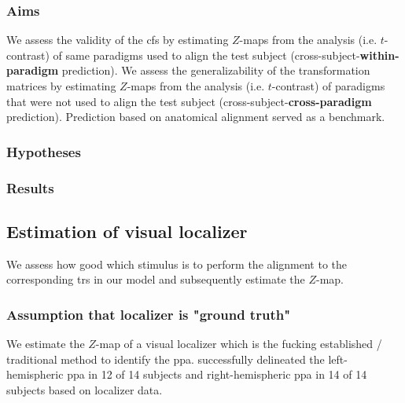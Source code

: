 \subsubsection{Aims}



%
We assess the validity of the \ac{cfs} by estimating $Z$-maps from the analysis
(i.e. $t$-contrast) of same paradigms used to align the test subject
(cross-subject-\textbf{within-paradigm} prediction).
%
We assess the generalizability of the transformation matrices by estimating
$Z$-maps from the analysis (i.e. $t$-contrast) of paradigms that were not used
to align the test subject (cross-subject-\textbf{cross-paradigm} prediction).
%
Prediction based on anatomical alignment served as a benchmark.


\subsubsection{Hypotheses}



\subsubsection{Results}







\subsection{Estimation of visual localizer}

We assess how good which stimulus is to perform the alignment to the
corresponding \acp{tr} in our model and subsequently estimate the $Z$-map.


\subsubsection{Assumption that localizer is "ground truth"}

We estimate the $Z$-map of a visual localizer which is the fucking established /
traditional method to identify the \ac{ppa}.
%
\citet{sengupta2016extension} successfully delineated the left-hemispheric
\ac{ppa} in 12 of 14 subjects and right-hemispheric \ac{ppa} in 14 of 14
subjects based on localizer data.


